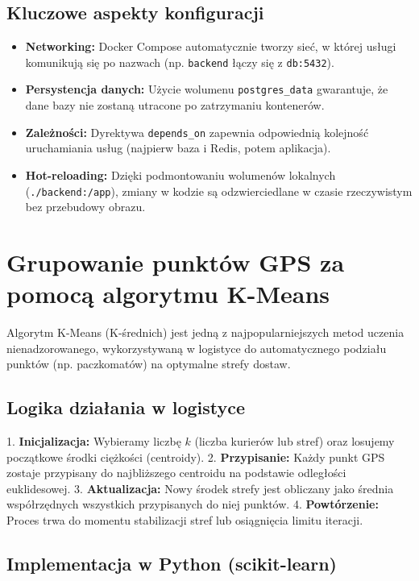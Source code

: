 \subsection*{Kluczowe aspekty konfiguracji}

\begin{itemize}
    \item \textbf{Networking:} Docker Compose automatycznie tworzy sieć, w której usługi komunikują się po nazwach (np. \texttt{backend} łączy się z \texttt{db:5432}).
    \item \textbf{Persystencja danych:} Użycie wolumenu \texttt{postgres\_data} gwarantuje, że dane bazy nie zostaną utracone po zatrzymaniu kontenerów.
    \item \textbf{Zależności:} Dyrektywa \texttt{depends\_on} zapewnia odpowiednią kolejność uruchamiania usług (najpierw baza i Redis, potem aplikacja).
    \item \textbf{Hot-reloading:} Dzięki podmontowaniu wolumenów lokalnych (\texttt{./backend:/app}), zmiany w kodzie są odzwierciedlane w czasie rzeczywistym bez przebudowy obrazu.
\end{itemize}

\section{Grupowanie punktów GPS za pomocą algorytmu K-Means}

Algorytm K-Means (K-średnich) jest jedną z najpopularniejszych metod uczenia nienadzorowanego, wykorzystywaną w logistyce do automatycznego podziału punktów (np. paczkomatów) na optymalne strefy dostaw.

\subsection*{Logika działania w logistyce}

1. \textbf{Inicjalizacja:} Wybieramy liczbę $k$ (liczba kurierów lub stref) oraz losujemy początkowe środki ciężkości (centroidy).
2. \textbf{Przypisanie:} Każdy punkt GPS zostaje przypisany do najbliższego centroidu na podstawie odległości euklidesowej.
3. \textbf{Aktualizacja:} Nowy środek strefy jest obliczany jako średnia współrzędnych wszystkich przypisanych do niej punktów.
4. \textbf{Powtórzenie:} Proces trwa do momentu stabilizacji stref lub osiągnięcia limitu iteracji.

\subsection*{Implementacja w Python (scikit-learn)}

